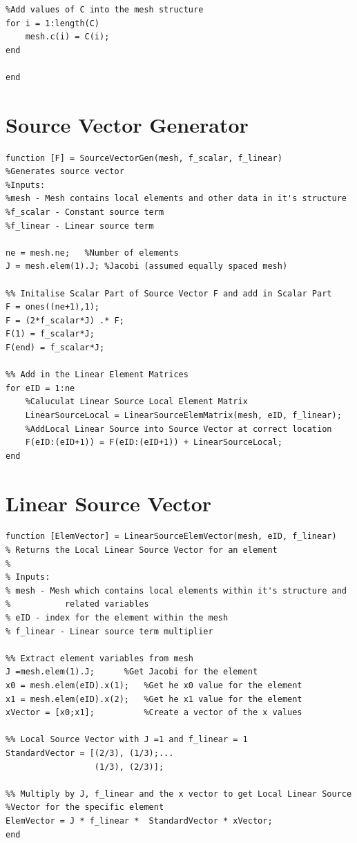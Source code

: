 \documentclass[11pt]{article}
\begin{document}
\begin{appendices}
\begin{lstlisting}
%Add values of C into the mesh structure
for i = 1:length(C)
    mesh.c(i) = C(i);
end

end
\end{lstlisting}
\pagebreak

\section{Source Vector Generator} \label{ap:SVG}
\begin{lstlisting}
function [F] = SourceVectorGen(mesh, f_scalar, f_linear)
%Generates source vector
%Inputs:
%mesh - Mesh contains local elements and other data in it's structure
%f_scalar - Constant source term
%f_linear - Linear source term

ne = mesh.ne;   %Number of elements
J = mesh.elem(1).J; %Jacobi (assumed equally spaced mesh)

%% Initalise Scalar Part of Source Vector F and add in Scalar Part
F = ones((ne+1),1);
F = (2*f_scalar*J) .* F;
F(1) = f_scalar*J;
F(end) = f_scalar*J;

%% Add in the Linear Element Matrices
for eID = 1:ne
    %Caluculat Linear Source Local Element Matrix
    LinearSourceLocal = LinearSourceElemMatrix(mesh, eID, f_linear);
    %AddLocal Linear Source into Source Vector at correct location
    F(eID:(eID+1)) = F(eID:(eID+1)) + LinearSourceLocal;
end
\end{lstlisting}
\clearpage



\section{Linear Source Vector} \label{ap:LSV}
\begin{lstlisting}
function [ElemVector] = LinearSourceElemVector(mesh, eID, f_linear)
% Returns the Local Linear Source Vector for an element
%
% Inputs:
% mesh - Mesh which contains local elements within it's structure and
%           related variables
% eID - index for the element within the mesh
% f_linear - Linear source term multiplier

%% Extract element variables from mesh
J =mesh.elem(1).J;      %Get Jacobi for the element
x0 = mesh.elem(eID).x(1);   %Get he x0 value for the element
x1 = mesh.elem(eID).x(2);   %Get he x1 value for the element
xVector = [x0;x1];          %Create a vector of the x values

%% Local Source Vector with J =1 and f_linear = 1
StandardVector = [(2/3), (1/3);...
                  (1/3), (2/3)];
              
%% Multiply by J, f_linear and the x vector to get Local Linear Source 
%Vector for the specific element
ElemVector = J * f_linear *  StandardVector * xVector;
end
\end{lstlisting}
\end{appendices}
\end{document}
